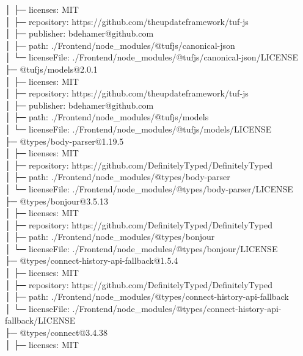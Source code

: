 \documentclass[
    paper=a4,
    twoside=false,
    parskip=half,
    listof=entryprefix,
    listof=totoc,
    index=totoc,
    bibliography=totoc,
    headsepline,
]{scrbook}
\begin{document}
    │  ├─ licenses: MIT\\
    │  ├─ repository: https://github.com/theupdateframework/tuf-js\\
    │  ├─ publisher: bdehamer@github.com\\
    │  ├─ path: ./Frontend/node\_modules/@tufjs/canonical-json\\
    │  └─ licenseFile: ./Frontend/node\_modules/@tufjs/canonical-json/LICENSE\\
    ├─ @tufjs/models@2.0.1\\
    │  ├─ licenses: MIT\\
    │  ├─ repository: https://github.com/theupdateframework/tuf-js\\
    │  ├─ publisher: bdehamer@github.com\\
    │  ├─ path: ./Frontend/node\_modules/@tufjs/models\\
    │  └─ licenseFile: ./Frontend/node\_modules/@tufjs/models/LICENSE\\
    ├─ @types/body-parser@1.19.5\\
    │  ├─ licenses: MIT\\
    │  ├─ repository: https://github.com/DefinitelyTyped/DefinitelyTyped\\
    │  ├─ path: ./Frontend/node\_modules/@types/body-parser\\
    │  └─ licenseFile: ./Frontend/node\_modules/@types/body-parser/LICENSE\\
    ├─ @types/bonjour@3.5.13\\
    │  ├─ licenses: MIT\\
    │  ├─ repository: https://github.com/DefinitelyTyped/DefinitelyTyped\\
    │  ├─ path: ./Frontend/node\_modules/@types/bonjour\\
    │  └─ licenseFile: ./Frontend/node\_modules/@types/bonjour/LICENSE\\
    ├─ @types/connect-history-api-fallback@1.5.4\\
    │  ├─ licenses: MIT\\
    │  ├─ repository: https://github.com/DefinitelyTyped/DefinitelyTyped\\
    │  ├─ path: ./Frontend/node\_modules/@types/connect-history-api-fallback\\
    │  └─ licenseFile: ./Frontend/node\_modules/@types/connect-history-api-fallback/LICENSE\\
    ├─ @types/connect@3.4.38\\
    │  ├─ licenses: MIT\\
\end{document}
